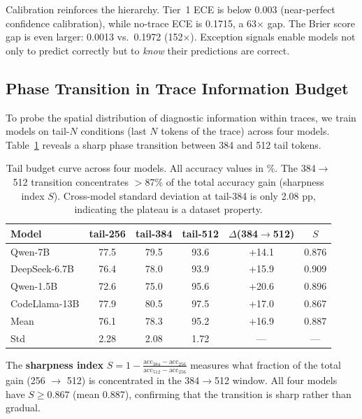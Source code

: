 \documentclass[11pt]{article}
\begin{document}
Calibration reinforces the hierarchy. Tier~1 ECE is below 0.003 (near-perfect confidence calibration), while no-trace ECE is 0.1715, a 63$\times$ gap. The Brier score gap is even larger: 0.0013 vs.\ 0.1972 (152$\times$). Exception signals enable models not only to predict correctly but to \emph{know} their predictions are correct.

\subsection{Phase Transition in Trace Information Budget}
\label{sec:phase_transition}

To probe the spatial distribution of diagnostic information within traces, we train models on tail-$N$ conditions (last $N$ tokens of the trace) across four models. Table~\ref{tab:budget_curve} reveals a sharp phase transition between 384 and 512 tail tokens.

\begin{table}[t]
\centering
\caption{Tail budget curve across four models. All accuracy values in \%. The 384$\to$512 transition concentrates $>$87\% of the total accuracy gain (sharpness index $S$). Cross-model standard deviation at tail-384 is only 2.08 pp, indicating the plateau is a dataset property.}
\label{tab:budget_curve}
\small
\begin{tabular}{lccccc}
\toprule
\textbf{Model} & \textbf{tail-256} & \textbf{tail-384} & \textbf{tail-512} & \textbf{$\Delta$(384$\to$512)} & \textbf{$S$} \\
\midrule
Qwen-7B & 77.5 & 79.5 & 93.6 & +14.1 & 0.876 \\
DeepSeek-6.7B & 76.4 & 78.0 & 93.9 & +15.9 & 0.909 \\
Qwen-1.5B & 72.6 & 75.0 & 95.6 & +20.6 & 0.896 \\
CodeLlama-13B & 77.9 & 80.5 & 97.5 & +17.0 & 0.867 \\
\midrule
Mean & 76.1 & 78.3 & 95.2 & +16.9 & 0.887 \\
Std & 2.28 & 2.08 & 1.72 & --- & --- \\
\bottomrule
\end{tabular}
\end{table}

The \textbf{sharpness index} $S = 1 - \frac{\text{acc}_{384} - \text{acc}_{256}}{\text{acc}_{512} - \text{acc}_{256}}$ measures what fraction of the total gain (256 $\to$ 512) is concentrated in the 384$\to$512 window. All four models have $S \geq 0.867$ (mean 0.887), confirming that the transition is sharp rather than gradual.
\end{document}
